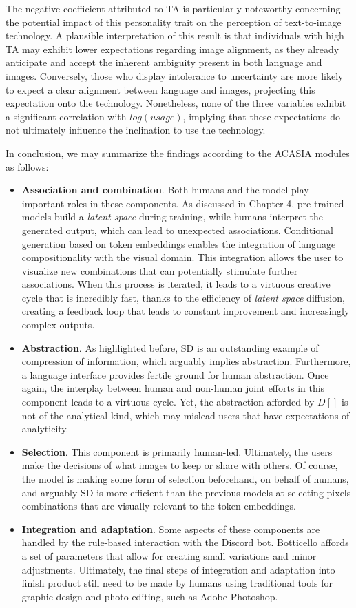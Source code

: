 The negative coefficient attributed to TA is particularly noteworthy concerning the potential impact of this personality trait on the perception of text-to-image technology. A plausible interpretation of this result is that individuals with high TA may exhibit lower expectations regarding image alignment, as they already anticipate and accept the inherent ambiguity present in both language and images. Conversely, those who display intolerance to uncertainty are more likely to expect a clear alignment between language and images, projecting this expectation onto the technology. Nonetheless, none of the three variables exhibit a significant correlation with $log(usage)$, implying that these expectations do not ultimately influence the inclination to use the technology.

In conclusion, we may summarize the findings according to the ACASIA modules as follows:

\begin{itemize}

\item \textbf{Association and combination}. Both humans and the model play important roles in these components. As discussed in Chapter 4, pre-trained models build a \emph{latent space} during training, while humans interpret the generated output, which can lead to unexpected associations. Conditional generation based on token embeddings enables the integration of language compositionality with the visual domain. This integration allows the user to visualize new combinations that can potentially stimulate further associations. When this process is iterated, it leads to a virtuous creative cycle that is incredibly fast, thanks to the efficiency of \emph{latent space} diffusion, creating a feedback loop that leads to constant improvement and increasingly complex outputs.
\item \textbf{Abstraction}. As highlighted before, SD is an outstanding example of compression of information, which arguably implies abstraction. Furthermore, a language interface provides fertile ground for human abstraction. Once again, the interplay between human and non-human joint efforts in this component leads to a virtuous cycle. Yet, the abstraction afforded by $D[]$ is not of the analytical kind, which may mislead users that have expectations of analyticity.
\item \textbf{Selection}. This component is primarily human-led. Ultimately, the users make the decisions of what images to keep or share with others. Of course, the model is making some form of selection beforehand, on behalf of humans, and arguably SD is more efficient than the previous models at selecting pixels combinations that are visually relevant to the token embeddings.
\item \textbf{Integration and adaptation}. Some aspects of these components are handled by the rule-based interaction with the Discord bot. Botticello affords a set of parameters that allow for creating small variations and minor adjustments. Ultimately, the final steps of integration and adaptation into finish product still need to be made by humans using traditional tools for graphic design and photo editing, such as Adobe Photoshop.
\end{itemize}

